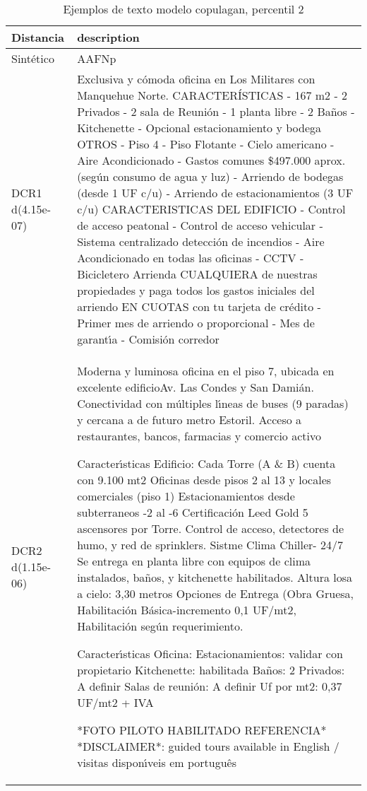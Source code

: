 \begin{table}[H]
\centering
\fontsize{10}{14}\selectfont
\caption{Ejemplos de texto modelo copulagan, percentil 2}
\label{table-example-economicos-a-3-copulagan-2p-text}
\begin{tabular}{|l|m{35em}|}
\hline
\rowcolor[gray]{0.8}
Distancia & description \\
\hline Sintético & AAFNp \\
\hline DCR1 d(4.15e-07) & Exclusiva y c\'omoda oficina en Los Militares con Manquehue Norte.  CARACTER\'ISTICAS - 167 m2 - 2 Privados - 2 sala de Reuni\'on - 1 planta libre - 2 Ba\~nos - Kitchenette - Opcional estacionamiento y bodega  OTROS - Piso 4 - Piso Flotante - Cielo americano  - Aire Acondicionado - Gastos comunes \$497.000 aprox. (seg\'un consumo de agua y luz) - Arriendo de bodegas (desde 1 UF c/u) - Arriendo de estacionamientos (3 UF c/u)  CARACTERISTICAS DEL EDIFICIO - Control de acceso peatonal - Control de acceso vehicular - Sistema centralizado detecci\'on de incendios - Aire Acondicionado en todas las oficinas - CCTV - Bicicletero  Arrienda CUALQUIERA de nuestras propiedades y paga todos los gastos iniciales del arriendo EN CUOTAS con tu tarjeta de cr\'edito - Primer mes de arriendo o proporcional - Mes de garant{\'\i}a - Comisi\'on corredor \\
\hline DCR2 d(1.15e-06) & Moderna y luminosa oficina en el piso 7, ubicada en excelente edificioAv. Las Condes y San Dami\'an. Conectividad con m\'ultiples l{\'\i}neas de buses (9 paradas) y cercana a de futuro metro Estoril. Acceso a restaurantes, bancos, farmacias y comercio activo

Caracter{\'\i}sticas Edificio:
 Cada Torre (A \& B) cuenta con 9.100 mt2
Oficinas desde pisos 2 al 13 y locales comerciales (piso 1)
 Estacionamientos desde subterraneos -2 al -6
Certificaci\'on Leed Gold
5 ascensores por Torre.
Control de acceso, detectores de humo, y red de sprinklers.
Sistme Clima Chiller- 24/7
 Se entrega en planta libre con equipos de clima instalados, ba\~nos, y kitchenette habilitados.
Altura losa a cielo: 3,30 metros
Opciones de Entrega (Obra Gruesa, Habilitaci\'on B\'asica-incremento 0,1 UF/mt2, Habilitaci\'on seg\'un requerimiento.

Caracter{\'\i}sticas Oficina:
 Estacionamientos: validar con propietario
Kitchenette: habilitada
Ba\~nos: 2
Privados: A definir
Salas de reuni\'on: A definir
Uf por mt2: 0,37 UF/mt2 + IVA

*FOTO PILOTO HABILITADO REFERENCIA*
*DISCLAIMER*: guided tours available in English / visitas dispon{\'\i}veis em portugu\^es \\
\hline
\end{tabular}
\end{table}
